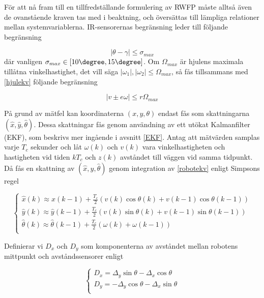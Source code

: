 \documentclass[11pt]{article}
\begin{document}
\begin{flushleft}
För att nå fram till en tillfredställande formulering av RWFP måste alltså även de ovanstående kraven tas med i beaktning, och översättas till lämpliga relationer mellan systemvariablerna. IR-sensorernas begränsning leder till följande begränsning

\begin{equation}\label{IRkrav}
	|\theta - \gamma| \leq \sigma_{max}
\end{equation}
där vanligen \(\sigma_{max} \in [10\degree,15\degree]\). Om $\Omega_{max}$ är hjulens maximala tillåtna vinkelhastighet, det vill säga \(|\omega_1|,|\omega_2| \leq \Omega_{max}\), så fås tillsammans med \eqref{hjulekv} följande begränsning

\begin{equation}\label{hastbegr}
	|v \pm e\omega| \leq r\Omega_{max}
\end{equation}

På grund av mätfel kan koordinaterna \((x,y,\theta)\) endast fås som skattningarna \((\hat{x},\hat{y},\hat{\theta})\). Dessa skattningar fås genom användning av ett utökat Kalmanfilter (EKF), som beskrivs mer ingående i avsnitt \ref{EKF}. Antag att mätvärden samplas varje $T_c$ sekunder och låt $\omega(k)$ och $v(k)$ vara vinkelhastigheten och hastigheten vid tiden $kT_c$ och $z(k)$ avståndet till väggen vid samma tidpunkt. Då fås en skattning av $(\hat{x},\hat{y},\hat{\theta})$ genom integration av \eqref{robotekv} enligt Simpsons regel

\begin{equation}\label{rwfpåterkoppling}
	\begin{cases}
	\hat{x}(k) \approx \hat{x}(k-1) + \frac{T_c}{2} (v(k) \cos \theta(k) + v(k-1)\cos \theta(k-1)) \\
	\hat{y}(k) \approx \hat{y}(k-1) + \frac{T_c}{2} (v(k) \sin \theta(k) + v(k-1)\sin \theta(k-1)) \\
	\hat{\theta}(k) \approx \hat{\theta}(k-1) + \frac{T_c}{2} (\omega(k) + \omega(k-1)) \\
	\end{cases}
\end{equation}

Definierar vi $D_x$ och $D_y$ som komponenterna av avståndet mellan robotens mittpunkt och avståndssensorer enligt

\begin{equation*}
	\begin{cases}
	D_x = \Delta_y \sin \theta - \Delta_x \cos \theta \\
	D_y = -\Delta_y \cos \theta - \Delta_x \sin \theta \\
	\end{cases}
\end{equation*}


\end{flushleft}
\end{document}
